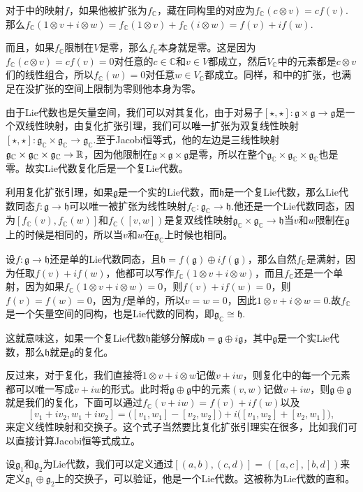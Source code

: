\documentclass[11pt]{article}
\theoremstyle{definition}
\theoremstyle{plain}
\newcommand{\cc}{\mathbb{C}}
\newcommand{\lag}{{\mathfrak{g}}}
\begin{document}
对于中的映射$f$，如果他被扩张为$f_\cc$，藏在同构里的对应为$f_\cc(c\otimes v)=cf(v)$.那么$f_\cc(1\otimes v+i\otimes w)=f_\cc(1\otimes v)+f_\cc(i\otimes w)=f(v)+if(w)$.

而且，如果$f_\cc$限制在$V$是零，那么$f_\cc$本身就是零。这是因为$f_\cc(c\otimes v)=cf(v)=0$对任意的$c\in \cc$和$v\in V$都成立，然后$V_\cc$中的元素都是$c\otimes v$们的线性组合，所以$f_\cc(w)=0$对任意$w\in V_\cc$都成立。同样，和中的扩张，也满足在没扩张的空间上限制为零则他本身为零。

\para 由于Lie代数也是矢量空间，我们可以对其复化，由于对易子$[\star,\star]:\lag\times \lag\to \lag$是一个双线性映射，由复化扩张引理，我们可以唯一扩张为双复线性映射$[\star,\star]:\lag_\cc\times \lag_\cc\to \lag_\cc$.至于Jacobi恒等式，他的左边是三线性映射$\lag_\cc\times \lag_\cc\times \lag_\cc\to\rr$，因为他限制在$\lag\times \lag\times \lag$是零，所以在整个$\lag_\cc\times \lag_\cc\times \lag_\cc$也是零。故实Lie代数复化后是一个复Lie代数。

\para 利用复化扩张引理，如果$\lag$是一个实的Lie代数，而$\mathfrak{h}$是一个复Lie代数，那么Lie代数同态$f:\lag\to \mathfrak{h}$可以唯一被扩张为线性映射$f_\cc:\lag_\cc\to \mathfrak{h}$.他还是一个Lie代数同态，因为$[f_\cc(v),f_\cc(w)]$和$f_\cc([v,w])$是复双线性映射$\lag_\cc\times \lag_\cc\to\mathfrak{h}$当$v$和$w$限制在$\lag$上的时候是相同的，所以当$v$和$w$在$\lag_\cc$上时候也相同。

设$f:\lag\to\mathfrak{h}$还是单的Lie代数同态，且$\mathfrak{h}=f(\lag)\oplus if(\lag)$，那么自然$f_\cc$是满射，因为任取$f(v)+if(w)$，他都可以写作$f_\cc(1\otimes v+i\otimes w)$，而且$f_\cc$还是一个单射，因为如果$f_\cc(1\otimes v+i\otimes w)=0$，则$f(v)+if(w)=0$，则$f(v)=f(w)=0$，因为$f$是单的，所以$v=w=0$，因此$1\otimes v+i\otimes w=0$.故$f_\cc$是一个矢量空间的同构，也是Lie代数的同构，即$\lag_\cc\cong \mathfrak{h}$. 

这就意味这，如果一个复Lie代数$\mathfrak{h}$能够分解成$\mathfrak{h}=\lag\oplus i\lag$，其中$\lag$是一个实Lie代数，那么$\mathfrak{h}$就是$\lag$的复化。

反过来，对于复化，我们直接将$1\otimes v+i\otimes w$记做$v+iw$，则复化中的每一个元素都可以唯一写成$v+iw$的形式。此时将$\lag\oplus \lag$中的元素$(v,w)$记做$v+iw$，则$\lag\oplus \lag$就是我们的复化，下面可以通过$f_\cc(v+iw)=f(v)+if(w)$以及
\[
	[v_1+iv_2,w_1+iw_2]=\bigl([v_1,w_1]-[v_2,w_2]\bigr)+i\bigl([v_1,w_2]+[v_2,w_1]\bigr),
\]
来定义线性映射和交换子。这个式子当然要比复化扩张引理实在很多，比如我们可以直接计算Jacobi恒等式成立。

\para 设$\lag_1$和$\lag_2$为Lie代数，我们可以定义通过$[(a,b),(c,d)]=\left([a,c],[b,d]\right)$来定义$\lag_1\oplus \lag_2$上的交换子，可以验证，他是一个Lie代数。这被称为Lie代数的直和。
\end{document}
